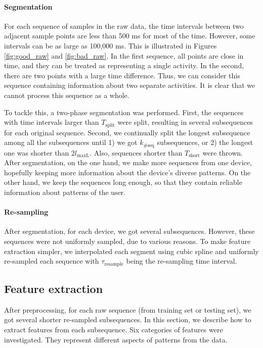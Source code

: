 \documentclass{article} %
\begin{document}
\paragraph{Segmentation} %
For each sequence of samples in the raw data, the time intervals between two adjacent sample points are less than 500 ms for most of the time. However, some intervals can be as large as 100,000 ms. This is illustrated in Figures \ref{fig:good_raw} and \ref{fig:bad_raw}. In the first sequence, all  points are close in time, and they can be treated as representing a single activity. In the second, there are two points with a large time difference. Thus, we can consider this sequence containing information about two separate activities. It is clear that we cannot process this sequence as a whole. %

To tackle this, a two-phase segmentation was performed. First, the sequences with time intervals larger than $T_\mathrm{split}$ were split, resulting in several subsequences for each original sequence. Second, we continually split the longest subsequence among all the subsequences until 1) we got $k_\mathrm{\#seq}$ subsequences, or 2) the longest one was shorter than $2 l_\mathrm{maxL}$. Also, sequences shorter than $T_\mathrm{short}$ were thrown. After segmentation, on the one hand, we make more sequences from one device, hopefully keeping more information about the device's diverse patterns. On the other hand, we keep the sequences long enough, so that they contain reliable information about patterns of the user.

\paragraph{Re-sampling} 
After segmentation, for each device, we got several subsequences. However, these sequences were not uniformly sampled, due to various reasons. To make feature extraction simpler, we interpolated each segment using cubic spline and uniformly re-sampled each sequence with  $\tau_\mathrm{resample}$ being the re-sampling time interval.

\subsection{Feature extraction}
\label{feautures}

After preprocessing, for each raw sequence (from training set or testing set), we got several shorter re-sampled subsequences. In this section, we describe how to extract features from each subsequence. Six categories of features were investigated. They represent different aspects of patterns from the data.
\end{document}
